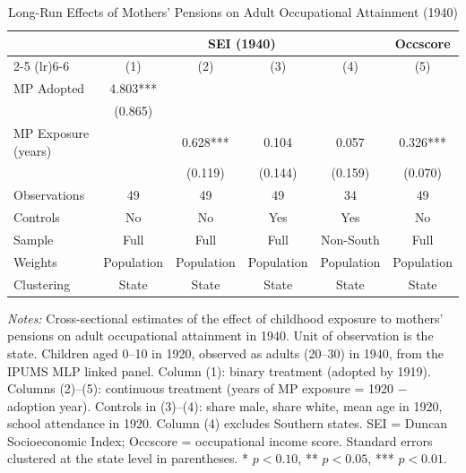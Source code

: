 \begin{table}[H]
\centering
\caption{Long-Run Effects of Mothers' Pensions on Adult Occupational Attainment (1940)}
\begin{threeparttable}
\begin{tabular}{lccccc}
\toprule
 & \multicolumn{4}{c}{SEI (1940)} & Occscore \\
\cmidrule(lr){2-5} \cmidrule(lr){6-6}
 & (1) & (2) & (3) & (4) & (5) \\
\midrule
MP Adopted & 4.803*** & & & & \\
 & (0.865) & & & & \\[3pt]
MP Exposure (years) & & 0.628*** & 0.104 & 0.057 & 0.326*** \\
 & & (0.119) & (0.144) & (0.159) & (0.070) \\[6pt]
Observations & 49 & 49 & 49 & 34 & 49 \\
Controls & No & No & Yes & Yes & No \\
Sample & Full & Full & Full & Non-South & Full \\
Weights & Population & Population & Population & Population & Population \\
Clustering & State & State & State & State & State \\
\bottomrule
\end{tabular}
\begin{tablenotes}[flushleft]
\small
\item \textit{Notes:} Cross-sectional estimates of the effect of childhood exposure to mothers' pensions on adult occupational attainment in 1940. Unit of observation is the state. Children aged 0--10 in 1920, observed as adults (20--30) in 1940, from the IPUMS MLP linked panel. Column (1): binary treatment (adopted by 1919). Columns (2)--(5): continuous treatment (years of MP exposure = 1920 $-$ adoption year). Controls in (3)--(4): share male, share white, mean age in 1920, school attendance in 1920. Column (4) excludes Southern states. SEI = Duncan Socioeconomic Index; Occscore = occupational income score. Standard errors clustered at the state level in parentheses. * $p<0.10$, ** $p<0.05$, *** $p<0.01$.
\end{tablenotes}
\end{threeparttable}
\label{tab:long_run}
\end{table}
